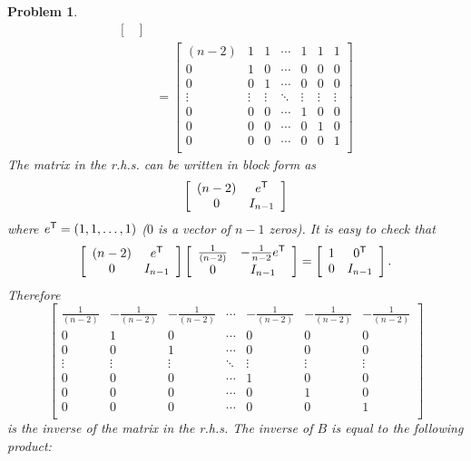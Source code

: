 \documentclass{article}
\theoremstyle{pprop}
\newtheorem{problem}{Problem}[section]
\begin{document}
\begin{problem}
\begin{align*}
\begin{bmatrix}
\end{bmatrix}\\
& = \begin{bmatrix}
(n-2) & 1 & 1 & \cdots & 1 & 1 & 1 \\
0 & 1 & 0 & \cdots & 0 & 0 & 0 \\
0 & 0 & 1 & \cdots & 0 & 0 & 0 \\
\vdots & \vdots & \vdots & \ddots & \vdots & \vdots & \vdots \\
0 & 0 & 0 & \cdots & 1 & 0 & 0 \\
0 & 0 & 0 & \cdots & 0 & 1 & 0 \\
0 & 0 & 0 & \cdots & 0 & 0 & 1 \\
\end{bmatrix}
\end{align*}
The matrix in the r.h.s. can be written in block form as 
$$
\left[
\begin{array}{cc}
(n-2) & e^{\sf T} \\
0 & I_{n-1}
\end{array}
\right]
$$
where $e^{\sf T}=(1,1,\ldots,1)$ ($0$ is a vector of $n-1$ zeros). It is easy to check that 
$$
\left[
\begin{array}{cc}
(n-2) & e^{\sf T} \\
0 & I_{n-1}
\end{array}
\right]
\left[
\begin{array}{cc}
\frac{1}{(n-2)} & -\frac{1}{n-2}e^{\sf T} \\
0 & I_{n-1}
\end{array}
\right]=
\left[
\begin{array}{cc}
1 & 0^{\sf T} \\
0 & I_{n-1}
\end{array}
\right].
$$
Therefore 
$$
\begin{bmatrix}
\frac{1}{(n-2)} & -\frac{1}{(n-2)} & -\frac{1}{(n-2)} & \cdots & -\frac{1}{(n-2)} & -\frac{1}{(n-2)} & -\frac{1}{(n-2)} \\
0 & 1 & 0 & \cdots & 0 & 0 & 0 \\
0 & 0 & 1 & \cdots & 0 & 0 & 0 \\
\vdots & \vdots & \vdots & \ddots & \vdots & \vdots & \vdots \\
0 & 0 & 0 & \cdots & 1 & 0 & 0 \\
0 & 0 & 0 & \cdots & 0 & 1 & 0 \\
0 & 0 & 0 & \cdots & 0 & 0 & 1 \\
\end{bmatrix}
$$
is the inverse of the matrix in the r.h.s. The inverse of $B$ is equal to the following product:

\end{problem}
\end{document}
